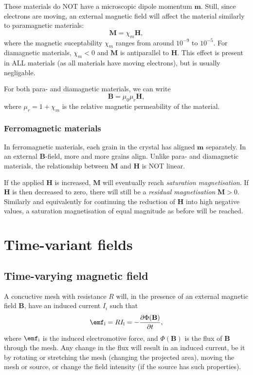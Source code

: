 \documentclass[a4paper, 12pt]{article}
\renewcommand{\vec}[1]{\mathbf{#1}}
\newcommand{\B}{\ensuremath{\vec{B}}}
\renewcommand{\H}{\ensuremath{\vec{H}}}
\begin{document}
            These materials do NOT have a microscopic dipole momentum $\vec{m}$. Still, since electrons are moving, 
            an external magnetic field will affect the material similarly to paramagnetic materials:
            \begin{equation}
                \vec{M} = \chi_m\H,
            \end{equation}
            where the magnetic suceptability $\chi_m$ ranges from around $10^{-9}$ to $10^{-5}$. 
            For diamagnetic materials, $\chi_m < 0$ and $\vec{M}$ is antiparallel to \H. 
            This effect is present in ALL materials (as all materials have moving electrons), but is usually negligable.
        
        For both para- and diamagnetic materials, we can write
        \begin{equation}
            \B = \mu_0 \mu_r \H,
        \end{equation}
        where $\mu_r = 1+\chi_m$ is the relative magnetic permeability of the material.
        
        \subsubsection{Ferromagnetic materials}
            In ferromagnetic materials, each grain in the crystal has aligned $\vec{m}$ separately. 
            In an external \B-field, more and more grains align. 
            Unlike para- and diamagnetic materials, the relationship between $\vec{M}$ and \H{} is NOT linear.

            If the applied \H{} is increased, $\vec{M}$ will eventually reach \textit{saturation magnetisation}. 
            If \H{} is then decreased to zero, there will still be a \textit{residual magnetisation} $\vec{M} > 0$. 
            Similarly and equivalently for continuing the reduction of \H{} into high negative values, 
            a saturation magnetisation of equal magnitude as before will be reached.

        
\section{Time-variant fields}
    \subsection{Time-varying magnetic field}
        A concuctive mesh with resistance $R$ will, in the presence of an external magnetic field \B, 
        have an induced current $I_i$ such that
        \begin{equation}
            \emf_\text{i} = RI_\text{i} = -\frac{\partial \Phi(\B)}{\partial t},
        \end{equation}
        where $\emf_\text{i}$ is the induced electromotive force, and $\Phi(\B)$ is the flux of \B{} through the mesh. 
        Any change in the flux will result in an induced current, 
        be it by rotating or stretching the mesh (changing the projected area),
        moving the mesh or source, or change the field intensity (if the source has such properties).
\end{document}
